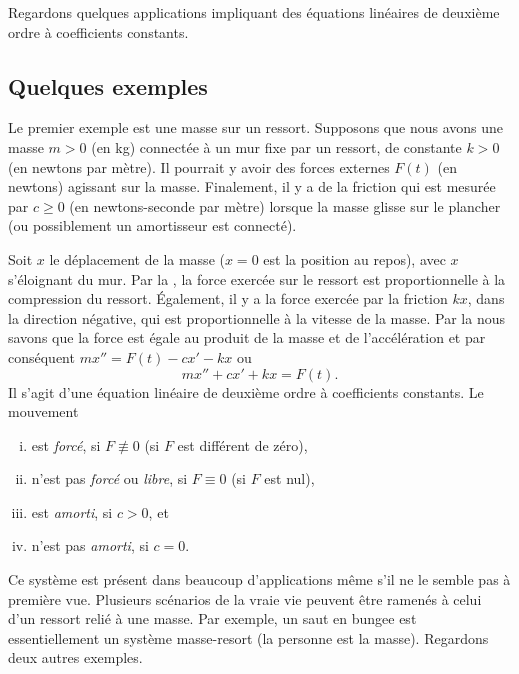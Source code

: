 
Regardons quelques applications impliquant des équations linéaires de deuxième ordre à coefficients constants. 
\subsection{Quelques exemples}

\begin{mywrapfigsimp}{2.0in}{2.3in}
\noindent
{}
\end{mywrapfigsimp}
Le premier exemple est une masse sur un ressort. Supposons que nous avons une masse $m > 0$ (en kg) connectée à un mur fixe par un ressort, de constante $k > 0$ (en newtons par mètre). Il pourrait y avoir des forces externes  $F(t)$ (en newtons) agissant sur la masse. Finalement, il y a de la friction qui est mesurée par $c \geq 0$ (en newtons-seconde par mètre) lorsque la masse glisse sur le plancher (ou possiblement un amortisseur est connecté). 

Soit $x$ le déplacement de la masse  ($x=0$ est la position au repos), avec
$x$ s'éloignant du mur.  
Par la , la force exercée sur le ressort est proportionnelle à la compression du ressort.
Également, il y a  la force exercée par la friction $kx$, dans la direction négative, qui est proportionnelle à la vitesse de la masse.
Par la  nous savons que la force est égale au produit de la masse et de l'accélération et par conséquent $mx'' = F(t)-cx'-kx$ ou
\begin{equation*}
mx'' + cx' + kx = F(t) .
\end{equation*}
Il s'agit d'une équation linéaire de deuxième ordre à coefficients constants. Le mouvement  
%
\begin{enumerate}[(i)]
\item  est \emph{forcé}, si $F \not\equiv 0$ (si $F$ est différent de zéro),
\item n'est pas \emph{ forcé } ou \emph{libre}, si $F \equiv 0$ (si $F$ est nul),
\item est \emph{amorti}, si $c > 0$, et
\item n'est pas \emph{amorti}, si $c = 0$.
\end{enumerate}
%
Ce système est présent dans beaucoup d'applications même s'il ne le semble pas à première vue. Plusieurs scénarios de la vraie vie peuvent être ramenés à celui d'un ressort relié à une masse. Par exemple, un saut en bungee est essentiellement un système masse-resort (la personne est la masse).  Regardons deux autres exemples.  

